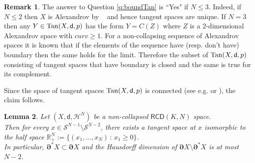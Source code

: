\documentclass[a4paper]{amsart}
\theoremstyle{plain}
\newtheorem{lemma}{Lemma}[section]
\theoremstyle{definition}
\newtheorem{remark}[lemma]{Remark}
\numberwithin{equation}{section}
\newcommand{\R}{\mathbb{R}}
\renewcommand{\S}{\mathcal{S}}
\newcommand{\RCD}{\mathsf{RCD}}
\newcommand{\sfd}{\mathsf d}
\newcommand{\cH}{\mathcal{H}}
\newcommand{\bRCD}{\boldsymbol\partial}
\begin{document}
{\begin{remark}
The answer to Question \ref{q:boundTan} is ``Yes" if $N\le 3$. Indeed, if $N\le 2$ then $X$ is Alexandrov by ~\cite{LS} and hence tangent  spaces are unique. If $N=3$ then any  $Y\in {\rm Tan}(X,\sfd,p)$ has the form  $Y=C(Z)$ where $Z$ is a 2-dimensional Alexandrov space with $curv\ge 1$. For a non-collapsing sequence of Alexandrov spaces it is known that if the elements of the sequence have (resp. don't have) boundary then the same holds for the limit. Therefore the subset of $ {\rm Tan}(X,\sfd,p)$ consisting of tangent  spaces that have boundary is closed and the same is true for its complement.

Since the space of tangent  spaces $ {\rm Tan}(X,\sfd,p)$ is connected (see e.g.  \cite[Lemma 2.1]{LS} or \cite[Lemma 3.2]{Donaldson-Sun}), the claim follows.
\end{remark}

\begin{lemma}\label{lem:TanSpXNC}
Let  $(X,\sfd,\cH^{N})$ be a non-collapsed $\RCD(K,N)$ space.
\\ Then for every $x\in \S^{N-1}\setminus \S^{N-2}$,  { there exists a} tangent space at $x$ isomorphic to the half space $\R^N_+:=\{(x_{1}, \dots, x_{N})\,:\, x_{1} \geq 0\}$.
\\In particular, $\bRCD^* X\subset \bRCD X$  { and  the Hausdorff dimension of  $\bRCD X \setminus \bRCD^* X$ is at most $N-2$.}
\end{lemma}

}
\end{document}
